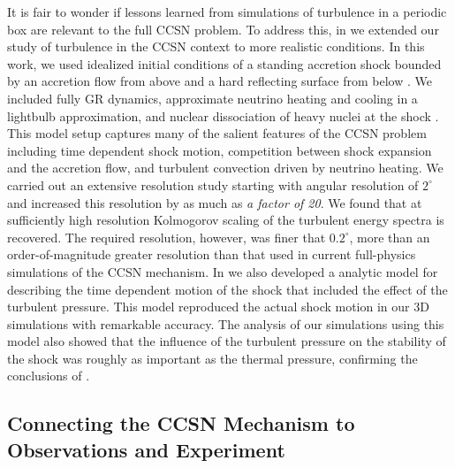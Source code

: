 It is fair to wonder if lessons learned from simulations of turbulence in a periodic box are relevant to the full CCSN problem.
To address this, in \citet{Radice:2015a} we extended our study of turbulence in the CCSN context to more realistic conditions.
In this work, we used idealized initial conditions of a standing accretion shock bounded by an accretion flow from above and a hard reflecting surface from below \citep[e.g.,][]{Blondin:2003}.
We included fully GR dynamics, approximate neutrino heating and cooling in a lightbulb approximation, and nuclear dissociation of heavy nuclei at the shock \citep{Fernandez:2009}.
This model setup captures many of the salient features of the CCSN problem including time dependent shock motion, competition between shock expansion and the accretion flow, and turbulent convection driven by neutrino heating.
We carried out an extensive resolution study starting with angular resolution of $2^\circ$ \citep[corresponding to the resolution of the 3D simulations in, e.g.,][]{Hanke:2013, Tamborra:2014, Melson:2015, Melson:2015a, Lentz:2015} and increased this resolution by as much as {\it a factor of 20}.
We found that at sufficiently high resolution Kolmogorov scaling of the turbulent energy spectra is recovered.
The required resolution, however, was finer that $0.2^\circ$, more than an order-of-magnitude greater resolution than that used in current full-physics simulations of the CCSN mechanism.
In \citet{Radice:2015a} we also developed a analytic model for describing the time dependent motion of the shock that included the effect of the turbulent pressure.
This model reproduced the actual shock motion in our 3D simulations with remarkable accuracy.
The analysis of our simulations using this model also showed that the influence of the turbulent pressure on the stability of the shock was roughly as important as the thermal pressure, confirming the conclusions of \citet{Couch:2015a}.

\subsection{Connecting the CCSN Mechanism to Observations and Experiment}

